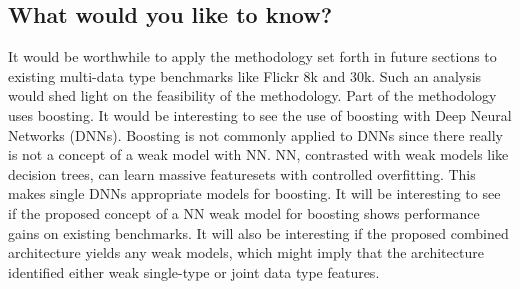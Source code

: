 \subsection{What would you like to know?}

It would be worthwhile to apply the methodology set forth in future sections to existing multi-data type benchmarks like Flickr 8k and 30k.  Such an analysis would shed light on the feasibility of the methodology.  Part of the methodology uses boosting.  It would be interesting to see the use of boosting with Deep Neural Networks (DNNs).  Boosting is not commonly applied to DNNs since there really is not a concept of a weak model with NN.  NN, contrasted with weak models like decision trees, can learn massive featuresets with controlled overfitting.  This makes single DNNs appropriate models for boosting.  It will be interesting to see if the proposed concept of a NN weak model for boosting shows performance gains on existing benchmarks.  It will also be interesting if the proposed combined architecture yields any weak models, which might imply that the architecture identified either weak single-type or joint data type features.



